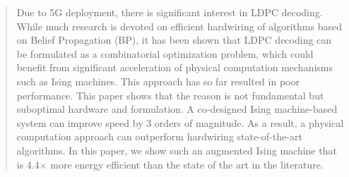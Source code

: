 \begin{abstract}\label{sec:abstract}

Due to 5G deployment, there is significant interest in LDPC decoding.
While much research is devoted on efficient hardwiring of algorithms 
based on Belief Propagation (BP), it has been shown that LDPC decoding can be formulated as a
combinatorial optimization problem, which could benefit from significant
acceleration of physical computation mechanisms such as
Ising machines. This approach has so far resulted in poor
performance. This paper shows that the reason is not fundamental but
suboptimal hardware and formulation. A co-designed Ising machine-based 
system can improve speed by 3 orders of magnitude. As a result,
a physical computation approach can outperform hardwiring
state-of-the-art algorithms. In this paper, we show such an
augmented Ising machine that is 4.4$\times$ more energy efficient than
the state of the art in the literature.




\end{abstract}
